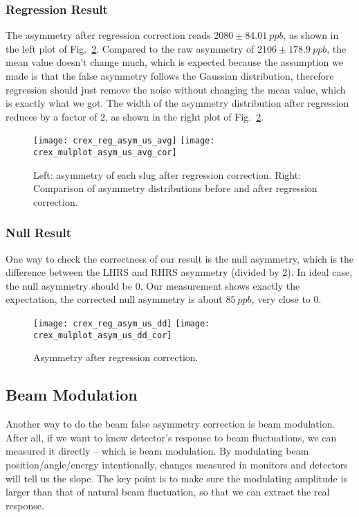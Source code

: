 \subsubsection{Regression Result}
The asymmetry after regression correction reads $2080 \pm 84.01\ ppb$, as shown 
in the left plot of Fig.~\ref{fig:reg_asym_us_avg}. Compared to the raw asymmetry
of $2106 \pm 178.9\ ppb$,
the mean value doesn't change much, which is expected because the assumption 
we made is that the false asymmetry follows the Gaussian distribution, therefore
regression should just remove the noise without changing the mean value, which
is exactly what we got. The width of the asymmetry distribution after regression
reduces by a factor of 2, as shown in the right plot of Fig.~\ref{fig:reg_asym_us_avg}.

\begin{figure}[H]
    \centering
    \texttt{[image: crex\_reg\_asym\_us\_avg]}
    \texttt{[image: crex\_mulplot\_asym\_us\_avg\_cor]}
    \caption{Left: asymmetry of each slug after regression correction.
    Right: Comparison of asymmetry distributions before and after regression correction.}
    \label{fig:reg_asym_us_avg}
\end{figure}

\subsubsection{Null Result}
One way to check the correctness of our result is the null asymmetry, which
is the difference between the LHRS and RHRS asymmetry (divided by 2). 
In ideal case, the null asymmetry should be 0. Our measurement shows exactly
the expectation, the corrected null asymmetry is about $85\ ppb$, very close
to 0.
\begin{figure}[H]
    \centering
    \texttt{[image: crex\_reg\_asym\_us\_dd]}
    \texttt{[image: crex\_mulplot\_asym\_us\_dd\_cor]}
    \caption{Asymmetry after regression correction.}
    \label{fig:reg_asym_us_avg}
\end{figure}

\subsection{Beam Modulation}
Another way to do the beam false asymmetry correction is beam modulation. After
all, if we want to know detector's response to beam fluctuations, we can measured
it directly -- which is beam modulation. By modulating beam position/angle/energy
intentionally, changes measured in monitors and detectors will tell us the slope.
The key point is to make sure the modulating amplitude is larger than that of 
natural beam fluctuation, so that we can extract the real response.

